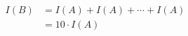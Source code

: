\documentclass[preview]{standalone}
\begin{document}
\begin{align*}
I(B) &= I(A) + I(A) + \cdots + I(A)\\ &= 10 \cdot I(A)
\end{align*}
\end{document}
